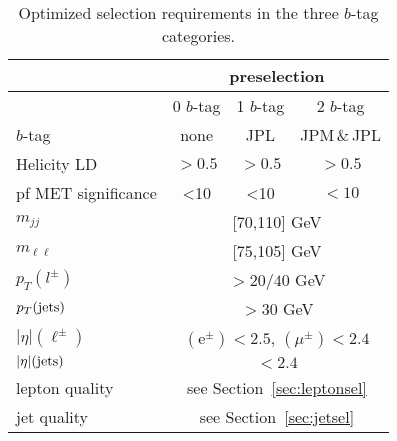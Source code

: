 \begin{table*}[hb]
\caption{ 
Optimized selection requirements in the three $b$-tag categories.
}
\label{finalSelection_tab}
\vspace*{\medskipamount}
\begin{center}
\small
\begin{tabular}{|l|c|c|c|}
\hline
  & \multicolumn{3}{|c|}{ preselection }\\
\hline
 & 0 $b$-tag & 1 $b$-tag  & 2 $b$-tag \\
\hline
$b$-tag & none & JPL &  JPM\,\&\,JPL\\
Helicity LD &  $>0.5$ & $>0.5$ & $> 0.5$ \\
pf MET significance &  <10 & <10 & $<10$  \\
\hline
${ m_{jj}}$  &  \multicolumn{3}{|c|}{[70,110] GeV} \\
${ m_{\ell\ell}}$  & \multicolumn{3}{|c|}{[75,105] GeV} \\

\hline
${p_T(l^\pm)}$  & \multicolumn{3}{|c|}{$>20/40$ GeV}\\
${p_T(\rm jets)}$ & \multicolumn{3}{|c|}{$>30$ GeV} \\
${ |\eta|(\ell^\pm)}$ &  \multicolumn{3}{|c|}{$(\mathrm{e}^\pm) <2.5$, $(\mu^\pm) <2.4$} \\
${ |\eta|(\rm jets)}$ &  \multicolumn{3}{|c|}{$<2.4$} \\
lepton quality  & \multicolumn{3}{|c|}{see Section~\ref{sec:leptonsel}}\\
jet quality  & \multicolumn{3}{|c|}{see Section~\ref{sec:jetsel}}\\
\hline
\end{tabular}
\end{center}
\end{table*}
